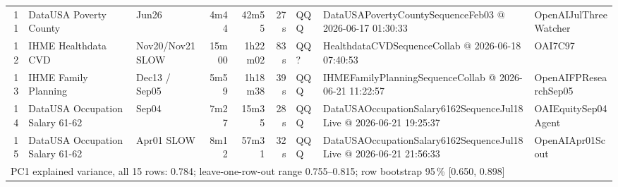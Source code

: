 \begin{tabular}{rllrrrlll}
11 & DataUSA Poverty County & Jun26 & 4m44 & 42m55 & 27\,s & QQQ & DataUSAPovertyCountySequenceFeb03 @ 2026-06-17 01:30:33 & OpenAIJulThreeWatcher \\
12 & IHME Healthdata CVD & Nov20/Nov21 SLOW & 15m00 & 1h22m02 & 83\,s & QQ? & HealthdataCVDSequenceCollab @ 2026-06-18 07:40:53 & OAI7C97 \\
13 & IHME Family Planning & Dec13 / Sep05 & 5m59 & 1h18m38 & 39\,s & QQQ & IHMEFamilyPlanningSequenceCollab @ 2026-06-21 11:22:57 & OpenAIFPResearchSep05 \\
14 & DataUSA Occupation Salary 61-62 & Sep04 & 7m27 & 15m35 & 28\,s & QQQ & DataUSAOccupationSalary6162SequenceJul18Live @ 2026-06-21 19:25:37 & OAIEquitySep04Agent \\
15 & DataUSA Occupation Salary 61-62 & Apr01 SLOW & 8m12 & 57m31 & 32\,s & QQQ & DataUSAOccupationSalary6162SequenceJul18Live @ 2026-06-21 21:56:33 & OpenAIApr01Scout \\
\midrule
\multicolumn{9}{l}{PC1 explained variance, all 15 rows: 0.784; leave-one-row-out range 0.755--0.815; row bootstrap 95\,\% [0.650, 0.898]} \\
\bottomrule
\end{tabular}
